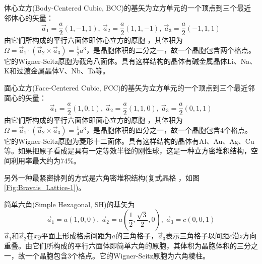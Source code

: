 {\heiti 体心立方(Body-Centered Cubic, BCC)}的基矢为立方单元的一个顶点到三个最近邻体心的矢量：
\begin{displaymath}
	\vec a_1=\frac a2(1,-1,1),~\vec a_2=\frac a2(1,1,-1),~\vec a_3=\frac a2(-1,1,1)
\end{displaymath} 
由它们所构成的平行六面体即体心立方的原胞 ，其体积为$\Omega=\vec a_1\cdot(\vec a_2\times\vec a_3)=\frac12a^3$，是晶胞体积的二分之一，故一个晶胞包含两个格点。它的Wigner-Seitz原胞为截角八面体。具有这样结构的晶体有碱金属晶体Li、Na、K和过渡金属晶体V、Nb、Ta等。

{\heiti 面心立方(Face-Centered Cubic, FCC)}的基矢为立方单元的一个顶点到三个最近邻面心的矢量：
\begin{displaymath}
	\vec a_1=\frac a2(1,0,1),~\vec a_2=\frac a2(1,1,0),~\vec a_3=\frac a2(0,1,1)
\end{displaymath} 
由它们所构成的平行六面体即面心立方的原胞 ，其体积为$\Omega=\vec a_1\cdot(\vec a_2\times\vec a_3)=\frac14a^3$，是晶胞体积的四分之一，故一个晶胞包含4个格点。它的Wigner-Seitz原胞为菱形十二面体。具有这样结构的晶体有Al、Au、Ag、Cu 等。如果把原子看成是具有一定等效半径的刚性球，这是一种立方密堆积结构，空间利用率最大约为74\%。

另外一种最紧密排列的方式是六角密堆积结构(复式晶格 ，如图\ref{Fig:Bravais_Lattice-1})。

{\heiti 简单六角(Simple Hexagonal, SH)}的基矢为
\begin{displaymath}
	\vec a_1=a(1,0,0),~\vec a_2=a(\frac12,\frac{\sqrt3}2,0),~\vec a_3=c(0,0,1)
\end{displaymath} 
$\vec a_1$和$\vec a_2$在$xy$平面上形成格点间距为$a$的三角格子，$\vec a_3$表示三角格子以间距$c$沿$z$方向重叠。由它们所构成的平行六面体即简单六角的原胞，其体积为晶胞体积的三分之一，故一个晶胞包含3个格点。它的Wigner-Seitz原胞为六角棱柱。


